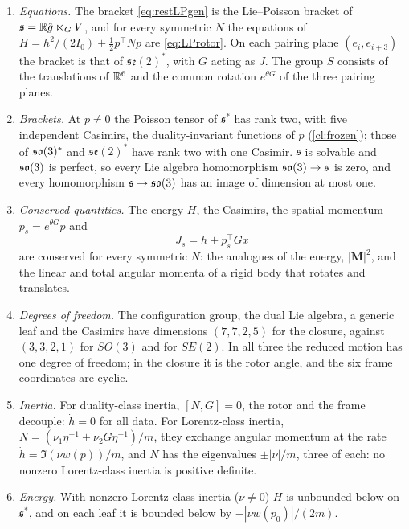 \begin{theorem}
\label{thm:esmap}
\begin{enumerate}[label=(\roman*),leftmargin=2.2em]
\item \emph{Equations.} The bracket \eqref{eq:restLPgen} is the Lie--Poisson bracket of $\mathfrak s=\mathbb{R}\hat g\ltimes_GV$, and for every symmetric $N$
the equations of $H=h^2/(2I_0)+\tfrac12p^{\!\top}Np$ are \eqref{eq:LProtor}. On each pairing plane $(e_i,e_{i+3})$ the bracket is that of
$\mathfrak{se}(2)^*$, with $G$ acting as $J$. The group $S$ consists of the translations of $\mathbb{R}^6$ and the common rotation $e^{\theta G}$ of the three
pairing planes.
\item \emph{Brackets.} At $p\neq0$ the Poisson tensor of $\mathfrak s^*$ has rank two, with five independent Casimirs, the duality-invariant
functions of $p$ (\cref{cl:frozen}); those of $\mathfrak{so}(3)^*$ and $\mathfrak{se}(2)^*$ have rank two with one Casimir. $\mathfrak s$ is solvable and $\mathfrak{so}(3)$
is perfect, so every Lie algebra homomorphism $\mathfrak{so}(3)\to\mathfrak s$ is zero, and every homomorphism $\mathfrak s\to\mathfrak{so}(3)$ has an image of dimension at
most one.
\item \emph{Conserved quantities.} The energy $H$, the Casimirs, the spatial momentum $p_s=e^{\theta G}p$ and
\[
J_s=h+p_s^{\!\top}Gx
\]
are conserved for every symmetric $N$: the analogues of the energy, $|\mathbf M|^2$, and the linear and total angular momenta of a rigid body
that rotates and translates.
\item \emph{Degrees of freedom.} The configuration group, the dual Lie algebra, a generic leaf and the Casimirs have dimensions $(7,7,2,5)$ for the
closure, against $(3,3,2,1)$ for $SO(3)$ and for $SE(2)$. In all three the reduced motion has one degree of freedom; in the closure it is the
rotor angle, and the six frame coordinates are cyclic.
\item \emph{Inertia.} For duality-class inertia, $[N,G]=0$, the rotor and the frame decouple: $\dot h=0$ for all data. For Lorentz-class
inertia, $N=(\nu_1\eta^{-1}+\nu_2G\eta^{-1})/m$, they exchange angular momentum at the rate $\dot h=\Im(\nu w(p))/m$, and $N$ has the eigenvalues
$\pm|\nu|/m$, three of each: no nonzero Lorentz-class inertia is positive definite.
\item \emph{Energy.} With nonzero Lorentz-class inertia ($\nu\neq0$) $H$ is unbounded below on $\mathfrak s^*$, and on each leaf it is bounded below by
$-|\nu w(p_0)|/(2m)$.
\end{enumerate}
\end{theorem}


